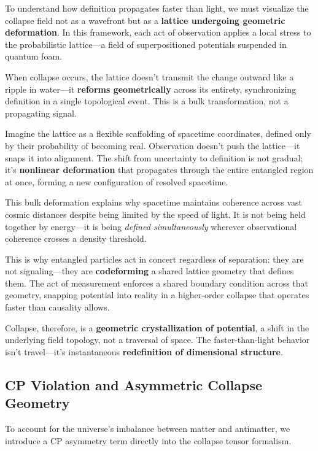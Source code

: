To understand how definition propagates faster than light, we must visualize the collapse field not as a wavefront but as a \textbf{lattice undergoing geometric deformation}. In this framework, each act of observation applies a local stress to the probabilistic lattice---a field of superpositioned potentials suspended in quantum foam.

When collapse occurs, the lattice doesn't transmit the change outward like a ripple in water---it \textbf{reforms geometrically} across its entirety, synchronizing definition in a single topological event. This is a bulk transformation, not a propagating signal.

Imagine the lattice as a flexible scaffolding of spacetime coordinates, defined only by their probability of becoming real. Observation doesn't push the lattice---it snaps it into alignment. The shift from uncertainty to definition is not gradual; it's \textbf{nonlinear deformation} that propagates through the entire entangled region at once, forming a new configuration of resolved spacetime.

This bulk deformation explains why spacetime maintains coherence across vast cosmic distances despite being limited by the speed of light. It is not being held together by energy---it is being \textit{defined simultaneously} wherever observational coherence crosses a density threshold.

This is why entangled particles act in concert regardless of separation: they are not signaling---they are \textbf{codeforming} a shared lattice geometry that defines them. The act of measurement enforces a shared boundary condition across that geometry, snapping potential into reality in a higher-order collapse that operates faster than causality allows.

Collapse, therefore, is a \textbf{geometric crystallization of potential}, a shift in the underlying field topology, not a traversal of space. The faster-than-light behavior isn't travel---it's instantaneous \textbf{redefinition of dimensional structure}.

\subsection{CP Violation and Asymmetric Collapse Geometry}\cite{emergent_field_core, entanglement_structure, quantum_thermo_laws, thermalization_dynamics, blackhole_collapse_links}

To account for the universe's imbalance between matter and antimatter, we introduce a CP asymmetry term directly into the collapse tensor formalism.

